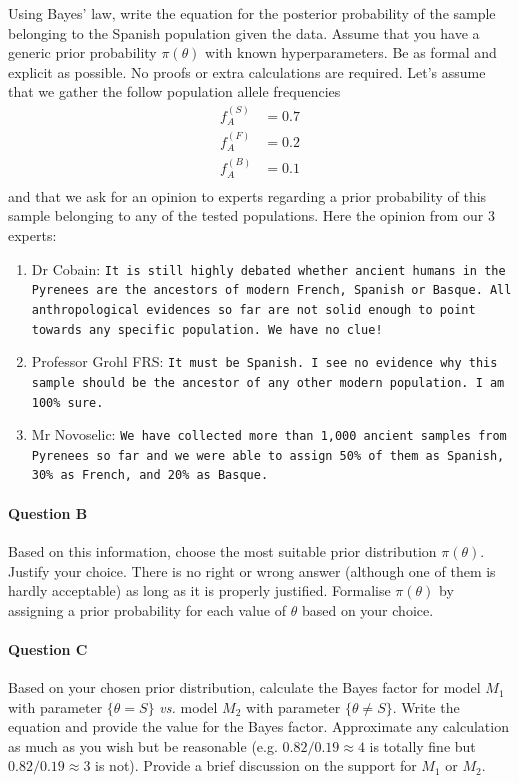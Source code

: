 Using Bayes' law, write the equation for the posterior probability of the sample belonging to the Spanish population given the data. Assume that you have a generic prior probability $\pi(\theta)$ with known hyperparameters. Be as formal and explicit as possible. No proofs or extra calculations are required.
Let's assume that we gather the follow population allele frequencies
\begin{align*}
f_A^{(S)} &= 0.7\\
f_A^{(F)} &= 0.2\\
f_A^{(B)} &= 0.1\\
\end{align*}
and that we ask for an opinion to experts regarding a prior probability of this sample belonging to any of the tested populations.
Here the opinion from our 3 experts:
\begin{enumerate}
        \item Dr Cobain: \texttt{It is still highly debated whether ancient humans in the Pyrenees are the ancestors of modern French, Spanish or Basque. All anthropological evidences so far are not solid enough to point towards any specific population. We have no clue!}
    \item Professor Grohl FRS: \texttt{It must be Spanish. I see no evidence why this sample should be the ancestor of any other modern population. I am 100\% sure.}
    \item Mr Novoselic: \texttt{We have collected more than 1,000 ancient samples from Pyrenees so far and we were able to assign 50\% of them as Spanish, 30\% as French, and 20\% as Basque.}
\end{enumerate}

\paragraph{Question B}

Based on this information, choose the most suitable prior distribution $\pi(\theta)$. Justify your choice. There is no right or wrong answer (although one of them is hardly acceptable) as long as it is properly justified. Formalise $\pi(\theta)$ by assigning a prior probability for each value of $\theta$ based on your choice.

\paragraph{Question C}

Based on your chosen prior distribution, calculate the Bayes factor for model $M_1$ with parameter $\{\theta=S\}$ \textit{vs.} model $M_2$ with parameter $\{\theta \neq S\}$. Write the equation and provide the value for the Bayes factor. Approximate any calculation as much as you wish but be reasonable (e.g. $0.82/0.19 \approx 4$ is totally fine but $0.82/0.19 \approx 3$ is not). Provide a brief discussion on the support for $M_1$ or $M_2$.


